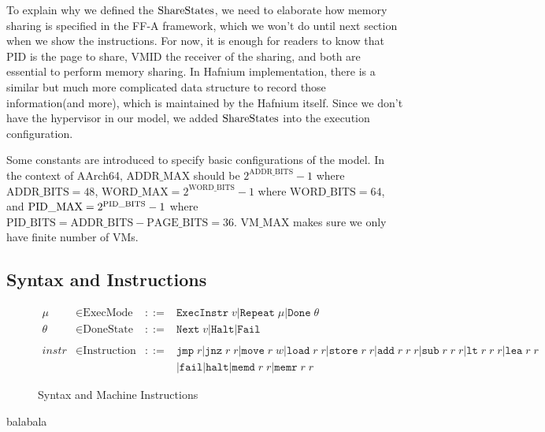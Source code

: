 \documentclass[a4paper]{article} \usepackage[a4paper]{geometry}
\newcommand*{\derived}{::=} \newcommand*{\sem}[1]{\llbracket {#1} \rrbracket}
\newcommand*{\PID}{\text{PID}} \newcommand*{\REGS}{\text{Registers}}
\newcommand*{\VMID}{\text{VMID}} \newcommand*{\REGNAMES}{\text{RegisterName}}
\newcommand*{\MODE}{\text{ExecMode}} \newcommand*{\DONE}{\text{DoneState}}
\newcommand*{\INSTR}{\text{Instruction}}
\newcommand*{\PABITS}{\text{ADDR\_BITS}}
\newcommand*{\PPBITS}{\text{PAGE\_BITS}}
\newcommand*{\PPIDBITS}{\text{PID\_BITS}} \newcommand*{\PAMAX}{\text{ADDR\_MAX}}
\newcommand*{\PWBITS}{\text{WORD\_BITS}} \newcommand*{\PWMAX}{\text{WORD\_MAX}}
\newcommand*{\PVMMAX}{\text{VM\_MAX}}
\newcommand*{\instrm}[1]{\mathtt{#1}} \newcommand*{\instr}[1]{\texttt{#1}}
\newcommand*{\NXT}[1]{\mathtt{Next} \; {#1}}
\begin{document}
To explain why we defined the $\text{ShareStates}$, we need to elaborate how memory sharing is
specified in the FF-A framework, which we won't do until next section when we
show the instructions. For now, it is enough for readers to know that $\PID$ is
the page to share, $\VMID$ the receiver of the sharing, and both are essential
to perform memory sharing. In Hafnium implementation, there is a similar but
much more complicated data structure to record those information(and more),
which is maintained by the Hafnium itself. Since we don't have the hypervisor in
our model, we added $\text{ShareStates}$ into the execution configuration.

Some constants are introduced to specify basic configurations of the model. In
the context of AArch64, $\PAMAX$ should be $2^{\PABITS} - 1$ where
$\PABITS = 48$, $\PWMAX = 2^{\PWBITS} -1$ where $\PWBITS = 64$, and
$\PPIDMAX = 2^{\PPIDBITS}-1$ where $\PPIDBITS = \PABITS - \PPBITS = 36$.
$\PVMMAX$ makes sure we only have finite number of VMs.





\subsection{Syntax and Instructions}
\begin{figure}[h!]
  \begin{align*}
    \mu &\in \MODE &\derived & \mathtt{ExecInstr} \; v | \mathtt{Repeat} \; \mu | \mathtt{Done} \; \theta \\
    \theta &\in \DONE &\derived & \NXT{v} | \mathtt{Halt} | \mathtt{Fail}\\
    \\
    instr & \in  \INSTR &\derived & \instrm{jmp} \; r | \instrm{jnz} \; r \; r | \instrm{move} \; r \; w | \instrm{load} \; r\; r | \instrm{store} \; r \; r | \instrm{add} \; r \; r \; r | \instrm{sub} \; r \; r \; r | \instrm{lt} \; r \; r \; r | \instrm{lea} \; r \; r \\
        & & & | \instrm{fail} | \instrm{halt} | \instrm{memd} \; r \; r | \instrm{memr} \; r\; r
  \end{align*}
  \caption{Syntax and Machine Instructions}
\end{figure}

 balabala
\end{document}
